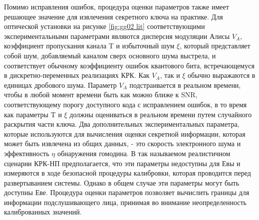 Помимо исправления ошибок, процедура оценки параметров также имеет решающее значение для извлечения секретного ключа на практике. Для оптической установки на рисунке \ref{fig:gg02 lit} соответствующими экспериментальными параметрами являются дисперсия модуляции Алисы $V_A$, коэффициент пропускания канала T и избыточный шум $\xi$, который представляет собой шум, добавляемый каналом сверх основного шума выстрела, и соответствует обычному коэффициенту ошибок квантового бита, встречающемуся в дискретно-переменных реализациях КРК. Как $V_A$, так и $\xi$ обычно выражаются в единицах дробового шума. Параметр $V_A$ подстраивается в реальном времени, чтобы в любой момент времени быть как можно ближе к SNR, соответствующему порогу доступного кода с исправлением ошибок, в то время как параметры T и $\xi$ должны оцениваться в реальном времени путем случайного раскрытия части ключа. Два дополнительных экспериментальных параметра, которые используются для вычисления оценки секретной информации, которая может быть извлечена из общих данных, - это скорость электронного шума и эффективность $\eta$ обнаружения гомодина. В так называемом реалистичном сценарии КРК-НП предполагается, что эти параметры недоступны для Евы и измеряются в ходе безопасной процедуры калибровки, которая проводится перед развертыванием системы. Однако в общем случае эти параметры могут быть доступны Еве. Процедура оценки параметров позволяет вычислить границы для информации подслушивающего лица, принимая во внимание неопределенность калиброванных значений.

